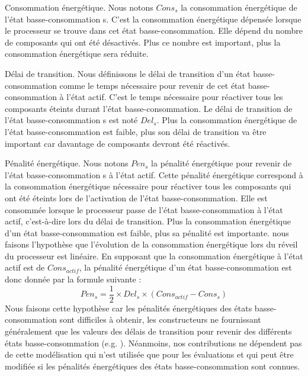 Consommation énergétique. Nous notons $Cons_s$ la consommation
énergétique de l’état basse-consommation s. C’est la consommation
énergétique dépensée lorsque le processeur se trouve dans cet état
basse-consommation.  Elle dépend du nombre de composants qui ont été
désactivés.  Plus ce nombre est important, plus la consommation
énergétique sera réduite.

Délai de transition. Nous définissons le délai de transition d’un état
basse-consommation comme le temps nécessaire pour revenir de cet état
basse-consommation à l’état actif.  C’est le temps nécessaire pour
réactiver tous les composants éteints durant l’état
basse-consommation.  Le délai de transition de l’état
basse-consommation s est noté $Del_s$.  Plus la consommation
énergétique de l’état basse-consommation est faible, plus son délai de
transition va être important car davantage de composants devront été
réactivés.

Pénalité énergétique. Nous notons $Pen_s$ la pénalité énergétique pour
revenir de l’état basse-consommation s à l’état actif.  Cette pénalité
énergétique correspond à la consommation énergétique nécessaire pour
réactiver tous les composants qui ont été éteints lors de l’activation
de l’état basse-consommation. Elle est consommée lorsque le processeur
passe de l’état basse-consommation à l’état actif, c’est-à-dire lors
du délai de transition. Plus la consommation énergétique d’un état
basse-consommation est faible, plus sa pénalité est importante.  nous
faisons l’hypothèse que l’évolution de la consommation énergétique
lors du réveil du processeur est linéaire. En supposant que la
consommation énergétique à l’état actif est de $Cons_{actif}$, la
pénalité énergétique d’un état basse-consommation est donc donnée par
la formule suivante :
\begin{equation}
Pen_s = \frac{1}{2} \times Del_s \times (Cons_{actif} - Cons_s)
\end{equation}
Nous faisons cette hypothèse car les pénalités énergétiques des états
basse-consommation sont difficiles à obtenir, les constructeurs ne
fournissant généralement que les valeurs des délais de transition pour
revenir des différents états basse-consommation (e.g. \cite{STM,
  MPC}). Néanmoins, nos contributions ne dépendent pas de cette
modélisation qui n’est utilisée que pour les évaluations et qui peut
être modifiée si les pénalités énergétiques des états
basse-consommation sont connues.

